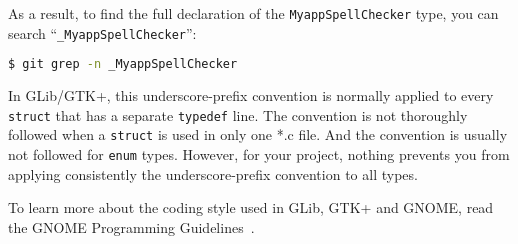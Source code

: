 As a result, to find the full declaration of the \lstinline{MyappSpellChecker} type, you can search ``\lstinline{_MyappSpellChecker}'':

\begin{lstlisting}[language=bash]
$ git grep -n _MyappSpellChecker
\end{lstlisting}

In GLib/GTK+, this underscore-prefix convention is normally applied to every \lstinline{struct} that has a separate \lstinline{typedef} line. The convention is not thoroughly followed when a \lstinline{struct} is used in only one *.c file. And the convention is usually not followed for \lstinline{enum} types. However, for your project, nothing prevents you from applying consistently the underscore-prefix convention to all types.

To learn more about the coding style used in GLib, GTK+ and GNOME, read the GNOME Programming Guidelines~\cite{gnome-programming-guidelines}.
